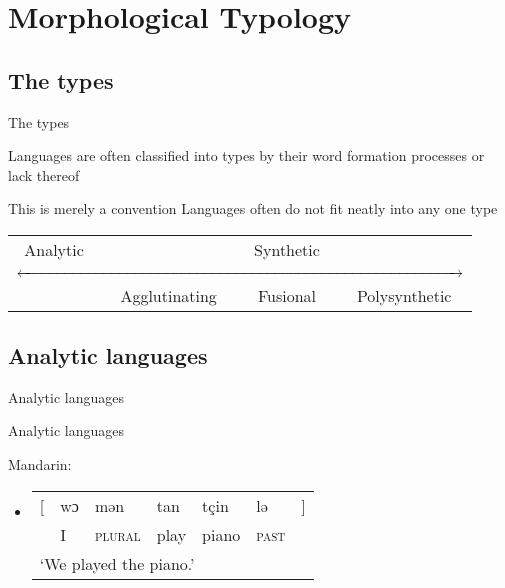 \documentclass{beamer}
\subtitle[Typologies \& Structures]{Morphological Typologies \& Hierarchical Word Structures}
\newcommand{\suboneone}{The types}
\newcommand{\subonetwo}{Analytic languages}
\begin{document}
  

  \section{Morphological Typology}
    \subsection{\suboneone}
      \begin{frame}{\suboneone}
        \begin{block}{}
          Languages are often classified into types by their word formation processes or lack thereof
        \end{block}
        \begin{alertblock}{This is merely a convention}
          Languages often do not fit neatly into any one type
        \end{alertblock}

        \vspace{1cm}
        \begin{tabular}{c | c c c}
          Analytic  &               & Synthetic & \\
          \multicolumn{4}{c}{$\xleftrightarrow{\hspace{0.9\linewidth}}$} \\
                    & Agglutinating & Fusional  & Polysynthetic
        \end{tabular}
      \end{frame}

    \subsection{\subonetwo}
      \begin{frame}{\subonetwo}
        \begin{alertblock}{Analytic languages}
          
        \end{alertblock}
        \begin{example}
          Mandarin:
          \begin{itemize}
            \item \begin{tabular}{r @{} l l l l l @{} l}
                    [  & wɔ  & mən             & tan   & tçin  & lə             & ] \\
                       & I   & \textsc{plural} & play  & piano & \textsc{past}  & \\
                    \multicolumn{6}{l}{`We played the piano.'}
                  \end{tabular}
          \end{itemize}
        \end{example}
      \end{frame}
\end{document}
